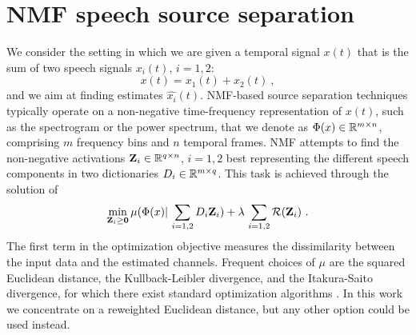 \section{NMF speech source separation}
\label{nmfsec}

%
We consider the setting in which we are given a temporal signal $x(t)$ that is the sum of  
two speech signals $x_i(t)$, $i=1,2$:
\begin{equation}
\label{ssep}
x(t) = x_1(t) + x_2(t)~,
\end{equation}
and we aim at finding estimates $\widehat{x_i}(t)$.
NMF-based source separation 
techniques typically operate on a non-negative time-frequency representation of $x(t)$, 
such as the spectrogram or the power spectrum,
that we denote as $\Phi(x) \in \mathbb{R}^{m \times n}$, comprising $m$ frequency bins and $n$ temporal frames. 
NMF attempts to find the non-negative activations $\bm{\mathrm{Z}}_i \in \mathbb{R}^{q \times n}$, $i=1,2$ 
best representing the different speech components in two dictionaries ${D}_{i} \in \mathbb{R}^{m \times q}$.
%
This task is achieved through the solution of %
\begin{eqnarray}
\label{eq:optim_general}
\min_{ \bm{\mathrm{Z}}_i \ge \bm{\mathrm{0}}  } \mu( \Phi(x) |  \, \sum_{i=1,2} {D}_i \bm{\mathrm{Z}}_{i}  ) + 
\lambda\, \sum_{i=1,2} \mathcal{R}(\bm{\mathrm{Z}}_i)~.
\end{eqnarray}
The first term in the optimization objective measures the dissimilarity between the input data and the estimated channels. 
Frequent choices of $\mu$ are the squared Euclidean distance,
the Kullback-Leibler divergence, and the Itakura-Saito divergence, for which there exist standard optimization algorithms \cite{fevotte2011algorithms}.
In this work we concentrate on a reweighted Euclidean distance, but any other option could be used instead.
%

